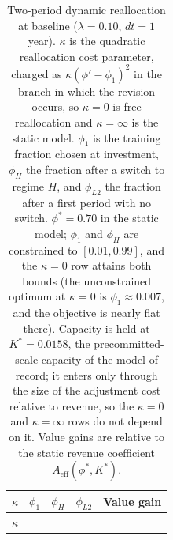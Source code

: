 \documentclass[
  11pt,
  letterpaper,
]{scrartcl}
\begin{document}
\begin{longtable}[]{@{}
  >{\centering\arraybackslash}p{}
  >{\centering\arraybackslash}p{}
  >{\centering\arraybackslash}p{}
  >{\centering\arraybackslash}p{}
  >{\centering\arraybackslash}p{}@{}}
\caption{Two-period dynamic reallocation at baseline
(\(\lambda = 0.10\), \(dt = 1\) year). \(\kappa\) is the quadratic
reallocation cost parameter, charged as \(\kappa (\phi' - \phi_1)^2\) in
the branch in which the revision occurs, so \(\kappa = 0\) is free
reallocation and \(\kappa = \infty\) is the static model. \(\phi_1\) is
the training fraction chosen at investment, \(\phi_H\) the fraction
after a switch to regime \(H\), and \(\phi_{L2}\) the fraction after a
first period with no switch. \(\phi^* = 0.70\) in the static model;
\(\phi_1\) and \(\phi_H\) are constrained to \([0.01, 0.99]\), and the
\(\kappa = 0\) row attains both bounds (the unconstrained optimum at
\(\kappa = 0\) is \(\phi_1 \approx 0.007\), and the objective is nearly
flat there). Capacity is held at \(K^* = 0.0158\), the
precommitted-scale capacity of the model of record; it enters only
through the size of the adjustment cost relative to revenue, so the
\(\kappa = 0\) and \(\kappa = \infty\) rows do not depend on it. Value
gains are relative to the static revenue coefficient
\(A_{\text{eff}}(\phi^*, K^*)\).}\label{tbl-dynamic-phi}\tabularnewline
\toprule\noalign{}
\begin{minipage}[b]{\linewidth}\centering
\(\kappa\)
\end{minipage} & \begin{minipage}[b]{\linewidth}\centering
\(\phi_1\)
\end{minipage} & \begin{minipage}[b]{\linewidth}\centering
\(\phi_H\)
\end{minipage} & \begin{minipage}[b]{\linewidth}\centering
\(\phi_{L2}\)
\end{minipage} & \begin{minipage}[b]{\linewidth}\centering
Value gain
\end{minipage} \\
\midrule\noalign{}
\endfirsthead
\toprule\noalign{}
\begin{minipage}[b]{\linewidth}\centering
\(\kappa\)
\end{minipage} & \begin{minipage}[b]{\linewidth}\centering

\end{minipage}
\end{longtable}
\end{document}
